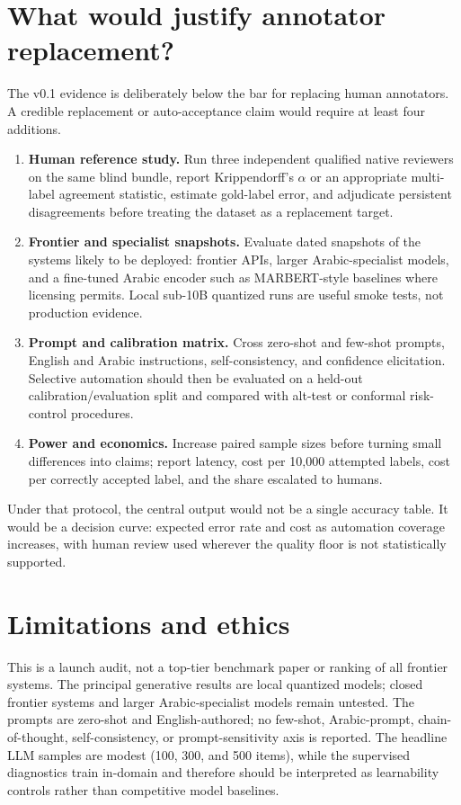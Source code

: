 \documentclass[10pt,twocolumn]{article}
\begin{document}
\section{What would justify annotator replacement?}
The v0.1 evidence is deliberately below the bar for replacing human
annotators. A credible replacement or auto-acceptance claim would require at
least four additions.
\begin{enumerate}
  \item \textbf{Human reference study.} Run three independent qualified native
  reviewers on the same blind bundle, report Krippendorff's $\alpha$ or an
  appropriate multi-label agreement statistic, estimate gold-label error, and
  adjudicate persistent disagreements before treating the dataset as a
  replacement target.
  \item \textbf{Frontier and specialist snapshots.} Evaluate dated snapshots
  of the systems likely to be deployed: frontier APIs, larger Arabic-specialist
  models, and a fine-tuned Arabic encoder such as MARBERT-style baselines
  where licensing permits. Local sub-10B quantized runs are useful smoke tests,
  not production evidence.
  \item \textbf{Prompt and calibration matrix.} Cross zero-shot and few-shot
  prompts, English and Arabic instructions, self-consistency, and confidence
  elicitation. Selective automation should then be evaluated on a held-out
  calibration/evaluation split and compared with alt-test or conformal
  risk-control procedures.
  \item \textbf{Power and economics.} Increase paired sample sizes before
  turning small differences into claims; report latency, cost per 10,000
  attempted labels, cost per correctly accepted label, and the share escalated
  to humans.
\end{enumerate}
Under that protocol, the central output would not be a single accuracy table.
It would be a decision curve: expected error rate and cost as automation
coverage increases, with human review used wherever the quality floor is not
statistically supported.

\section{Limitations and ethics}
This is a launch audit, not a top-tier benchmark paper or ranking of all
frontier systems. The principal generative results are local quantized models;
closed frontier systems and larger Arabic-specialist models remain untested.
The prompts are zero-shot and English-authored; no few-shot, Arabic-prompt,
chain-of-thought, self-consistency, or prompt-sensitivity axis is reported.
The headline LLM samples are modest (100, 300, and 500 items), while the
supervised diagnostics train in-domain and therefore should be interpreted as
learnability controls rather than competitive model baselines.
\end{document}
